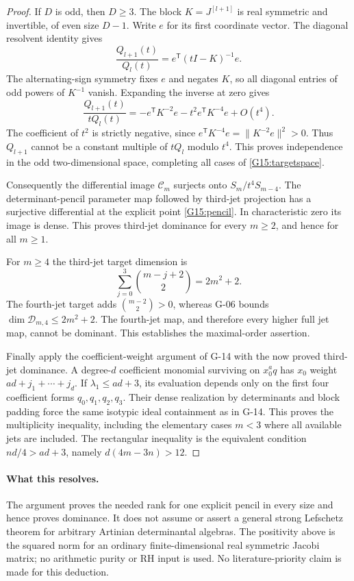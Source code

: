 \documentclass[11pt,a4paper]{article}
\theoremstyle{definition}\newtheorem{definition}{Definition}
\begin{document}
\begin{proof}
If $D$ is odd, then $D\geq3$. The block
$K=J^{[l+1]}$ is real symmetric and invertible,
of even size $D-1$. Write $e$ for its first
coordinate vector. The diagonal resolvent identity gives
\[
 \frac{Q_{l+1}(t)}{Q_l(t)}
    =e^{\mathsf T}(tI-K)^{-1}e.
\]
The alternating-sign symmetry fixes $e$ and negates
$K$, so all diagonal entries of odd powers of
$K^{-1}$ vanish. Expanding the inverse at zero gives
\[
 \frac{Q_{l+1}(t)}{tQ_l(t)}
   =-e^{\mathsf T}K^{-2}e
     -t^2 e^{\mathsf T}K^{-4}e
     +O(t^4).
\]
The coefficient of $t^2$ is strictly negative, since
$e^{\mathsf T}K^{-4}e=\|K^{-2}e\|^2>0$. Thus
$Q_{l+1}$ cannot be a constant multiple of $tQ_l$
modulo $t^4$. This proves independence in the odd
two-dimensional space, completing all cases of
\eqref{G15:targetspace}.

Consequently the differential image $\mathcal C_m$
surjects onto $S_m/t^4S_{m-4}$. The determinant-pencil
parameter map followed by third-jet projection has a
surjective differential at the explicit point
\eqref{G15:pencil}. In characteristic zero its image
is dense. This proves third-jet dominance for every
$m\geq2$, and hence for all $m\geq1$.

For $m\geq4$ the third-jet target dimension is
\[
 \sum_{j=0}^3\binom{m-j+2}{2}=2m^2+2.
\]
The fourth-jet target adds
$\binom{m-2}{2}>0$, whereas G-06 bounds
$\dim\mathcal D_{m,4}\leq2m^2+2$. The fourth-jet
map, and therefore every higher full jet map, cannot
be dominant. This establishes the maximal-order
assertion.

Finally apply the coefficient-weight argument of
G-14 with the now proved third-jet dominance. A
degree-$d$ coefficient monomial surviving on
$x_0^a q$ has $x_0$ weight
$ad+j_1+\cdots+j_d$. If $\lambda_1\leq ad+3$,
its evaluation depends only on the first four
coefficient forms $q_0,q_1,q_2,q_3$. Their dense
realization by determinants and block padding force
the same isotypic ideal containment as in G-14.
This proves the multiplicity inequality, including
the elementary cases $m<3$ where all available
jets are included. The rectangular inequality is
the equivalent condition
$nd/4>ad+3$, namely $d(4m-3n)>12$.
\end{proof}

\paragraph{What this resolves.}
The argument proves the needed rank for one explicit
pencil in every size and hence proves dominance. It
does not assume or assert a general strong Lefschetz
theorem for arbitrary Artinian determinantal algebras.
The positivity above is the squared norm for an
ordinary finite-dimensional real symmetric Jacobi
matrix; no arithmetic purity or RH input is used.
No literature-priority claim is made for this deduction.
\end{document}
